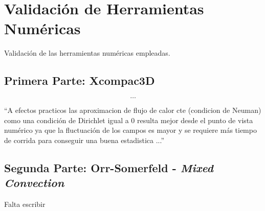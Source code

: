 \chapter{Validación de Herramientas Numéricas}


Validación de las herramientas numéricas empleadas.


\newpage

\section{Primera Parte: Xcompac3D}




$$\dots$$

``A efectos practicos las aproximacion de flujo de calor cte (condicion de Neuman) como una condición de Dirichlet igual a 0 resulta mejor desde el punto de vista numérico ya que la fluctuación de los campos es mayor y se requiere más tiempo de corrida para conseguir una buena estadistica ...''

\section{Segunda Parte: Orr-Somerfeld - \textit{Mixed Convection}}
Falta escribir




